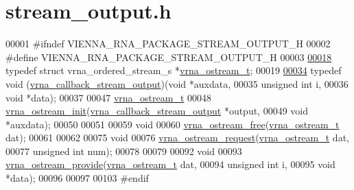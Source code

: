 \hypertarget{stream__output_8h_source}{}\section{stream\+\_\+output.\+h}
\label{stream__output_8h_source}

\begin{DoxyCode}
00001 \textcolor{preprocessor}{#ifndef VIENNA\_RNA\_PACKAGE\_STREAM\_OUTPUT\_H}
00002 \textcolor{preprocessor}{#define VIENNA\_RNA\_PACKAGE\_STREAM\_OUTPUT\_H}
00003 
\hyperlink{group__buffer__utils_ga8da189552af21ab6e4e88bdcc240870c}{00018} \textcolor{keyword}{typedef} \textcolor{keyword}{struct }vrna\_ordered\_stream\_s *\hyperlink{group__buffer__utils_ga8da189552af21ab6e4e88bdcc240870c}{vrna\_ostream\_t};
00019 
\hyperlink{group__buffer__utils_ga4adb94338a6f0a1a451e03c1bdac0d9d}{00034} \textcolor{keyword}{typedef} void (\hyperlink{group__buffer__utils_ga4adb94338a6f0a1a451e03c1bdac0d9d}{vrna\_callback\_stream\_output})(\textcolor{keywordtype}{void}         *auxdata,
00035                                            \textcolor{keywordtype}{unsigned} \textcolor{keywordtype}{int} i,
00036                                            \textcolor{keywordtype}{void}         *data);
00037 
00047 \hyperlink{group__buffer__utils_ga8da189552af21ab6e4e88bdcc240870c}{vrna\_ostream\_t}
00048 \hyperlink{group__buffer__utils_gad23113e66a0910ec2341856e2da56bf6}{vrna\_ostream\_init}(\hyperlink{group__buffer__utils_ga4adb94338a6f0a1a451e03c1bdac0d9d}{vrna\_callback\_stream\_output} *output,
00049                   \textcolor{keywordtype}{void}                        *auxdata);
00050 
00051 
00059 \textcolor{keywordtype}{void}
00060 \hyperlink{group__buffer__utils_gaf813ec90e1446ba82c89f9a39688a3b3}{vrna\_ostream\_free}(\hyperlink{group__buffer__utils_ga8da189552af21ab6e4e88bdcc240870c}{vrna\_ostream\_t} dat);
00061 
00062 
00075 \textcolor{keywordtype}{void}
00076 \hyperlink{group__buffer__utils_gaebca91932705d71bcbf00bd8d82bd7c8}{vrna\_ostream\_request}(\hyperlink{group__buffer__utils_ga8da189552af21ab6e4e88bdcc240870c}{vrna\_ostream\_t} dat,
00077                      \textcolor{keywordtype}{unsigned} \textcolor{keywordtype}{int}   num);
00078 
00079 
00092 \textcolor{keywordtype}{void}
00093 \hyperlink{group__buffer__utils_ga6253c42abdeaf3b41a38204865e1f0f7}{vrna\_ostream\_provide}(\hyperlink{group__buffer__utils_ga8da189552af21ab6e4e88bdcc240870c}{vrna\_ostream\_t} dat,
00094                      \textcolor{keywordtype}{unsigned} \textcolor{keywordtype}{int}   i,
00095                      \textcolor{keywordtype}{void}           *data);
00096 
00097 
00103 \textcolor{preprocessor}{#endif}
\end{DoxyCode}
